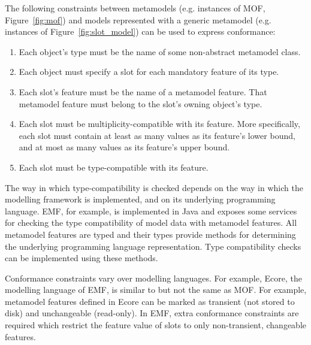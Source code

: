 The following constraints between metamodels (e.g. instances of MOF, Figure~\ref{fig:mof}) and models represented with a generic metamodel (e.g. instances of Figure~\ref{fig:slot_model}) can be used to express conformance:

\begin{enumerate}
	\item Each object's type must be the name of some non-abstract metamodel class.
	\item Each object must specify a slot for each mandatory feature of its type.
	\item Each slot's feature must be the name of a metamodel feature. That metamodel feature must belong to the slot's owning object's type.
	\item Each slot must be multiplicity-compatible with its feature. More specifically, each slot must contain at least as many values as its feature's lower bound, and at most as many values as its feature's upper bound.
  \item Each slot must be type-compatible with its feature.
\end{enumerate}

The way in which type-compatibility is checked depends on the way in which the modelling framework is implemented, and on its underlying programming language. EMF, for example, is implemented in Java and exposes some services for checking the type compatibility of model data with metamodel features. All metamodel features are typed and their types provide methods for determining the underlying programming language representation. Type compatibility checks can be implemented using these methods.

Conformance constraints vary over modelling languages. For example, Ecore, the modelling language of EMF, is similar to but not the same as MOF. For example, metamodel features defined in Ecore can be marked as transient (not stored to disk) and unchangeable (read-only). In EMF, extra conformance constraints are required which restrict the feature value of slots to only non-transient, changeable features.


